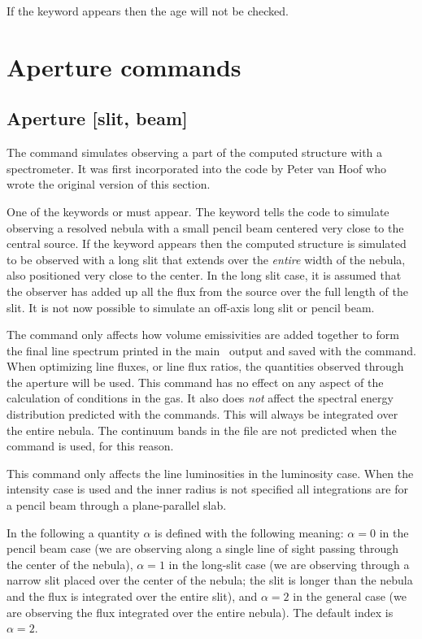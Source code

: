 If the keyword  appears then the age will not be checked.

\section{Aperture commands}

\subsection{Aperture [slit, beam]}

The  command simulates observing
a part of the computed structure
with a spectrometer.
It was first incorporated into the code by Peter van
Hoof who wrote the original version of this section.

One of the keywords  or  must appear.
The keyword  tells
the code to simulate observing a resolved nebula with a
small pencil beam centered very close to the central source.
If the keyword  appears then the computed structure
is simulated to be observed with a long slit that extends
over the {\em entire} width of the nebula, also positioned
very close to the center. In the long slit case, it is assumed
that the observer has added up all the flux from the source over the
full length of the slit. It is not now possible to simulate
an off-axis long slit or pencil beam.

The  command only affects how volume
emissivities are added
together to form the final line spectrum printed in the main \Cloudy\
output and saved with the  command.
When optimizing line fluxes, or line flux ratios, the quantities
observed through the aperture will be used.
This command has no effect on any aspect of
the calculation of conditions in the gas.
It also does {\em not} affect the spectral energy distribution
predicted with the  commands.
This will always be integrated over the entire nebula.
The continuum bands in the file  are not
predicted when the \cdCommand{aperture} command is used, for this reason.

This command only affects the line luminosities in the luminosity case.
When the intensity case is used and the inner radius
is not specified all integrations are for a pencil beam through a plane-parallel slab.

In the following a quantity $\alpha$ is defined
with the following meaning:
$\alpha = 0$ in the pencil beam case
(we are observing along a single line of sight
passing through the center of the nebula),
$\alpha = 1$ in the long-slit case (we
are observing through a narrow slit placed over the center of the nebula;
the slit is longer than the nebula and the
flux is integrated over the entire
slit), and $\alpha = 2$ in the general case
(we are observing the flux integrated
over the entire nebula).
The default index is $\alpha = 2$.

